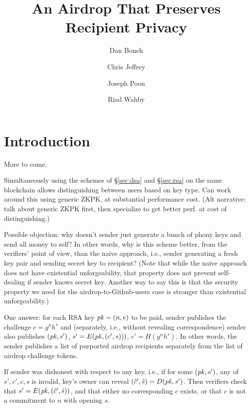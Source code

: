 \documentclass[11pt]{article}
\begin{document}
\title{An Airdrop That Preserves Recipient Privacy}
\author{Dan Boneh \and Chris Jeffrey \and Joseph Poon \and Riad Wahby}

\maketitle

\begin{abstract}
\end{abstract}

\section{Introduction}

More to come.

Simultaneously using the schemes of \S\ref{sec:dsa} and \S\ref{sec:rsa}
    on the same blockchain allows distinguishing between users based on
    key type.
Can work around this using generic ZKPK, at substantial performance cost.
(Alt narrative: talk about generic ZKPK first, then specialize to get better
    perf. at cost of distinguishing.)

Possible objection: why doesn't sender just generate a bunch of phony keys
    and send all money to self?
In other words, why is this scheme better, from the verifiers' point of view,
    than the naive approach, i.e., sender generating a fresh key pair and
    sending secret key to recipient?
(Note that while the naive approach does not have existential unforgeability,
    that property does not prevent self-dealing if sender knows secret key.
Another way to say this is that the security property we need for the
    airdrop-to-Github-users case is stronger than existential unforgeability.)

One answer: for each RSA key $\mathit{pk} = (n, e)$ to be paid, sender publishes
    the challenge $c = g^nh^s$ and (separately, i.e., without revealing
    correspondence) sender also publishes
$(\mathit{pk}, s')$, $s' = E(\mathit{pk}, (c',s)))$, $c' = H(g^nh^s)$.
In other words, the sender publishes a list of purported airdrop recipients
    separately from the list of airdrop challenge tokens.

If sender was dishonest with respect to any key, i.e., if for some $(\mathit{pk},
    s')$, any of $s', c', c, s$ is invalid, key's owner can reveal $(\hat{c}',
    \hat{s}) = D(\mathit{pk}, s')$.
Then verifiers check that $s' = E(\mathit{pk}, (\hat{c}', \hat{s}))$, and that
    either no corresponding $c$ exists, or that $c$ is not a commitment
    to $n$ with opening $s$.
\end{document}
